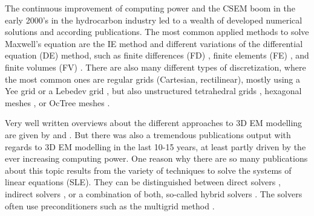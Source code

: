 \documentclass[
    paper,
  ]{geophysics}
\begin{document}
The continuous improvement of computing power and the CSEM boom in the early 2000's in the hydrocarbon industry led to a wealth of developed numerical solutions and according publications. The most common applied methods to solve Maxwell's equation are the IE method \citep{GJI.74.Raiche, RS.02.Hursan, GEO.06.Zhdanov, GP.10.Tehrani, CAG.16.Kruglyakov, MGS.17.Kruglyakov} and different variations of the differential equation (DE) method, such as finite differences (FD) \citep{GEO.93.Wang, RSC.94.Mackie, RS.94.Druskin, GEO.09.Streich, CAG.13.Sommer}, finite elements (FE) \citep{GEO.04.Commer, GJI.11.Schwarzbach,GEO.12.daSilva, GJI.13.Grayver, GJI.13.Puzyrev, SEG.16.Zhang}, and finite volumes (FV) \citep{EM.90.Madsen, SIAM.01.Haber, PIER.01.Clemens, GEO.14.Jahandari}. There are also many different types of discretization, where the most common ones are regular grids (Cartesian, rectilinear), mostly using a Yee grid \citep{IEEE.66.Yee} or a Lebedev grid \citep{CMMP.64.Lebedev}, but also unstructured tetrahedral grids \citep{SEG.16.Zhang, CAG.17.Cai}, hexagonal meshes \citep{CAG.14.Cai}, or OcTree meshes \citep{ECP.07.Haber}.

Very well written overviews about the different approaches to 3D EM modelling are given by \cite{SG.05.Avdeev} and \cite{SG.10.Borner}. But there was also a tremendous publications output with regards to 3D EM modelling in the last 10-15 years, at least partly driven by the ever increasing computing power. One reason why there are so many publications about this topic results from the variety of techniques to solve the systems of linear equations (SLE). They can be distinguished between direct solvers \citep{GEO.09.Streich, GP.14.Chung, GEO.14.Jaysaval, GEO.15.Grayver, SEG.15.Oh, GJI.18.Wang}, indirect solvers \citep{GJI.15.Jaysaval}, or a combination of both, so-called hybrid solvers \citep{GEO.18.Liu}. The solvers often use preconditioners such as the multigrid method \citep{SIAM.02.Aruliah, GJI.16.Jaysaval}.
\end{document}
